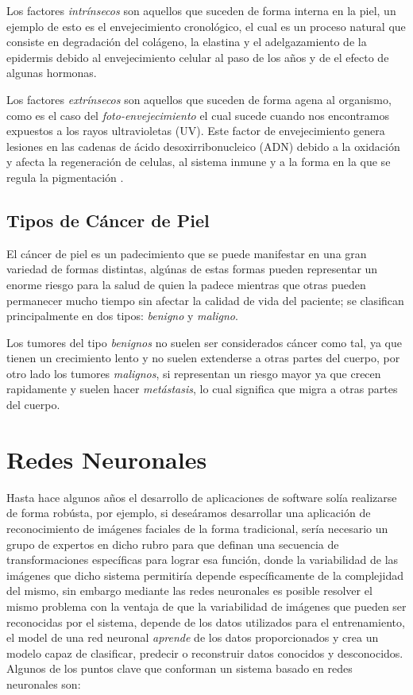 Los factores \emph{intrínsecos} son aquellos que suceden de forma interna en la piel, un ejemplo de esto es el envejecimiento cronológico, el cual es un proceso natural que consiste en degradación del colágeno, la elastina y el adelgazamiento de la epidermis debido al envejecimiento celular al paso de los años y de el efecto de algunas hormonas.

Los factores \emph{extrínsecos} son aquellos que suceden de forma agena al organismo, como es el caso del \emph{foto-envejecimiento} el cual sucede cuando nos encontramos expuestos a los rayos ultravioletas (UV). Este factor de envejecimiento genera lesiones en las cadenas de ácido desoxirribonucleico (ADN) debido a la oxidación y afecta la regeneración de celulas, al sistema inmune y a la forma en la que se regula la pigmentación \citep{skin_aging}.

\subsection{Tipos de Cáncer de Piel}
El cáncer de piel es un padecimiento que se puede manifestar en una gran variedad de formas distintas, algúnas de estas formas pueden representar un enorme riesgo para la salud de quien la padece mientras que otras pueden permanecer mucho tiempo sin afectar la calidad de vida del paciente; se clasifican principalmente en dos tipos: \emph{benigno} y \emph{maligno}.

Los tumores del tipo \emph{benignos} no suelen ser considerados cáncer como tal, ya que tienen un crecimiento lento y no suelen extenderse a otras partes del cuerpo, por otro lado los tumores \emph{malignos}, si representan un riesgo mayor ya que crecen rapidamente y suelen hacer \emph{metástasis}, lo cual significa que migra a otras partes del cuerpo.

\section{Redes Neuronales}

Hasta hace algunos años el desarrollo de aplicaciones de software solía realizarse de forma robústa, por ejemplo, si deseáramos desarrollar una aplicación de reconocimiento de imágenes faciales de la forma tradicional, sería necesario un grupo de expertos en dicho rubro para que definan una secuencia de transformaciones específicas para lograr esa función, donde la variabilidad de las imágenes que dicho sistema permitiría depende específicamente de la complejidad del mismo, sin embargo mediante las redes neuronales es posible resolver el mismo problema con la ventaja de que la variabilidad de imágenes que pueden ser reconocidas por el sistema, depende de los datos utilizados para el entrenamiento, el model de una red neuronal \emph{aprende} de los datos proporcionados y crea un modelo capaz de clasificar, predecir o reconstruir datos conocidos y desconocidos. Algunos de los puntos clave que conforman un sistema basado en redes neuronales son:

